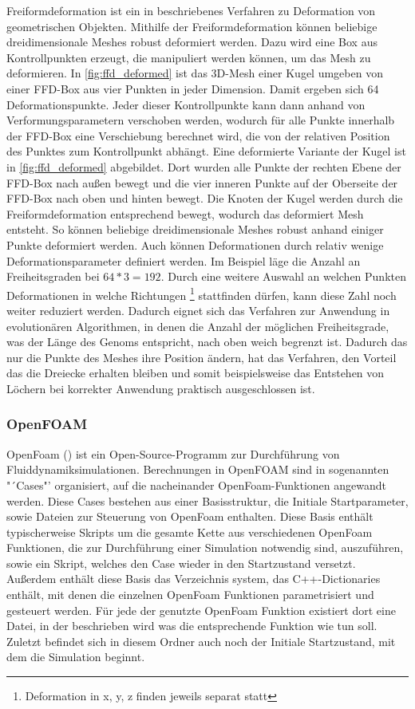 Freiformdeformation ist ein in \cite{Sederberg.1986} beschriebenes Verfahren zu Deformation von geometrischen Objekten.
Mithilfe der Freiformdeformation können beliebige dreidimensionale Meshes robust deformiert werden.
Dazu wird eine Box aus Kontrollpunkten erzeugt, die manipuliert werden können, um das Mesh zu deformieren.
In \cref{fig:ffd_deformed} ist das 3D-Mesh einer Kugel umgeben von einer FFD-Box aus vier Punkten in jeder Dimension.
Damit ergeben sich 64 Deformationspunkte.
Jeder dieser Kontrollpunkte kann dann anhand von Verformungsparametern verschoben werden, wodurch für alle Punkte innerhalb der FFD-Box eine Verschiebung berechnet wird, die von der relativen Position des Punktes zum Kontrollpunkt abhängt.
Eine deformierte Variante der Kugel ist in \cref{fig:ffd_deformed} abgebildet.
Dort wurden alle Punkte der rechten Ebene der FFD-Box nach außen bewegt und die vier inneren Punkte auf der Oberseite der FFD-Box nach oben und hinten bewegt.
Die Knoten der Kugel werden durch die Freiformdeformation entsprechend bewegt, wodurch das deformiert Mesh entsteht.
So können beliebige dreidimensionale Meshes robust anhand einiger Punkte deformiert werden.
Auch können Deformationen durch relativ wenige Deformationsparameter definiert werden.
Im Beispiel läge die Anzahl an Freiheitsgraden bei $64 * 3 = 192$.
Durch eine weitere Auswahl an welchen Punkten Deformationen in welche Richtungen 
\footnote{Deformation in x, y, z finden jeweils separat statt}
stattfinden dürfen, kann diese Zahl noch weiter reduziert werden.
Dadurch eignet sich das Verfahren zur Anwendung in evolutionären Algorithmen, in denen die Anzahl der möglichen Freiheitsgrade, was der Länge des Genoms entspricht, nach oben weich begrenzt ist.
Dadurch das nur die Punkte des Meshes ihre Position ändern, hat das Verfahren, den Vorteil das die Dreiecke erhalten bleiben und somit beispielsweise das Entstehen von Löchern bei korrekter Anwendung praktisch ausgeschlossen ist.

\subsubsection{OpenFOAM}
\label{sub:openfoam}
OpenFoam (\cite{OpenCFD.}) ist ein Open-Source-Programm zur Durchführung von Fluiddynamiksimulationen.
Berechnungen in OpenFOAM sind in sogenannten "´Cases"' organisiert, auf die nacheinander OpenFoam-Funktionen angewandt werden.
Diese Cases bestehen aus einer Basisstruktur, die Initiale Startparameter, sowie Dateien zur Steuerung von OpenFoam enthalten.
Diese Basis enthält typischerweise Skripts um die gesamte Kette aus verschiedenen OpenFoam Funktionen, die zur Durchführung einer Simulation notwendig sind, auszuführen, sowie ein Skript, welches den Case wieder in den Startzustand versetzt.
Außerdem enthält diese Basis das Verzeichnis system, das C++-Dictionaries enthält, mit denen die einzelnen OpenFoam Funktionen parametrisiert und gesteuert werden.
Für jede der genutzte OpenFoam Funktion existiert dort eine Datei, in der beschrieben wird was die entsprechende Funktion wie tun soll. 
Zuletzt befindet sich in diesem Ordner auch noch der Initiale Startzustand, mit dem die Simulation beginnt.

